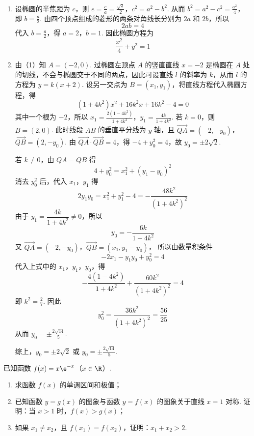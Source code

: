 \begin{solution}
\begin{enumerate}
\item 设椭圆的半焦距为 \(c\)，则
\(e=\frac{c}{a}=\frac{\sqrt{3}}{2}\)，\(c^2=a^2-b^2\).
从而 \(b^2=a^2-c^2=\frac{a^2}{4}\)，即 \(b=\frac{a}{2}\). 由四个顶点组成的菱形的两条对角线长分别为 \(2a\) 和 \(2b\)，所以
\[
2ab=4
\]
代入 \(b=\frac{a}{2}\)，得 \(a=2\)，\(b=1\). 因此椭圆方程为
\[
\frac{x^2}{4}+y^2=1
\]
\item 由（1）知 \(A=(-2,0)\). 过椭圆左顶点 \(A\) 的竖直直线 \(x=-2\) 是椭圆在 \(A\) 处的切线，不会与椭圆交于不同的两点，因此可设直线 \(l\) 的斜率为 \(k\)，从而 \(l\) 的方程为 \(y=k(x+2)\). 设另一交点为 \(B=(x_1,y_1)\)，将直线方程代入椭圆方程，得
\[
(1+4k^2)x^2+16k^2x+16k^2-4=0
\]
其中一个根为 \(-2\)，所以
\(x_1=\frac{2(1-4k^2)}{1+4k^2}\)，\(y_1=\frac{4k}{1+4k^2}\).
若 \(k=0\)，则 \(B=(2,0)\). 此时线段 \(AB\) 的垂直平分线为 \(y\) 轴，且
\(\overrightarrow{QA}=(-2,-y_0)\)，\(\overrightarrow{QB}=(2,-y_0)\).
由 \(\overrightarrow{QA}\cdot\overrightarrow{QB}=4\)，得 \(-4+y_0^2=4\)，故 \(y_0=\pm2\sqrt{2}\).

若 \(k\ne0\)，由 \(QA=QB\) 得
\[
4+y_0^2=x_1^2+(y_1-y_0)^2
\]
消去 \(y_0^2\) 后，代入 \(x_1\)，\(y_1\) 得
\[
2y_1y_0=x_1^2+y_1^2-4
=-\frac{48k^2}{(1+4k^2)^2}
\]
由于 \(y_1=\dfrac{4k}{1+4k^2}\ne0\)，所以
\[
y_0=-\frac{6k}{1+4k^2}
\]
又 \(\overrightarrow{QA}=(-2,-y_0)\)，\(\overrightarrow{QB}=(x_1,y_1-y_0)\)，
所以由数量积条件
\[
-2x_1-y_1y_0+y_0^2=4
\]
代入上式中的 \(x_1\)，\(y_1\)，\(y_0\)，得
\[
-\frac{4(1-4k^2)}{1+4k^2}+\frac{60k^2}{(1+4k^2)^2}=4
\]
即 \(k^2=\frac{2}{7}\). 因此
\[
y_0^2=\frac{36k^2}{(1+4k^2)^2}=\frac{56}{25}
\]
从而 \(y_0=\pm\frac{2\sqrt{14}}{5}\).

综上，\(y_0=\pm2\sqrt{2}\) 或 \(y_0=\pm\frac{2\sqrt{14}}{5}\).
\end{enumerate}
\end{solution}

\begin{problem}
已知函数 \( f(x) = x\e^{-x} \)（\(x \in \R\)）.
\begin{enumerate}
\item 求函数 \( f(x) \) 的单调区间和极值；
\item 已知函数 \( y = g(x) \) 的图象与函数 \( y = f(x) \) 的图象关于直线 \( x = 1 \) 对称. 证明：当 \( x > 1 \) 时，\( f(x) > g(x) \)；
\item 如果 \(x_{1} \neq x_{2}\)，且 \(f(x_{1}) = f(x_{2})\)，证明：\(x_{1} + x_{2} > 2\).
\end{enumerate}
\end{problem}

